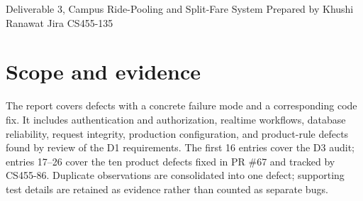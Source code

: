 \documentclass[10pt]{article}
\begin{document}
  {Deliverable 3, Campus Ride-Pooling and Split-Fare System}
  {Prepared by Khushi Ranawat \quad Jira CS455-135}
\section{Scope and evidence}
The report covers defects with a concrete failure mode and a corresponding code fix. It includes authentication and authorization, realtime workflows, database reliability, request integrity, production configuration, and product-rule defects found by review of the D1 requirements. The first 16 entries cover the D3 audit; entries 17--26 cover the ten product defects fixed in PR \#67 and tracked by CS455-86. Duplicate observations are consolidated into one defect; supporting test details are retained as evidence rather than counted as separate bugs.
\end{document}
